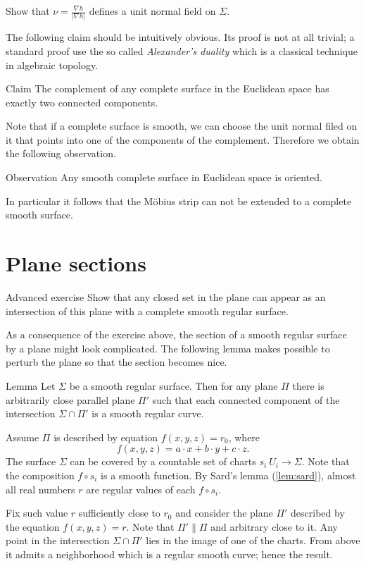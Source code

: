  Show that $\nu=\tfrac{\nabla h}{|\nabla h|}$ defines a unit normal field on $\Sigma$.

The following claim should be intuitively obvious. 
Its proof is not at all trivial; a standard proof use the so called \emph{Alexander's duality} which is a classical technique in algebraic topology.

\begin{thm}{Claim}
The complement of any complete surface in the Euclidean space has exactly two connected components. 
\end{thm}

Note that if a complete surface is smooth, we can choose the unit normal filed on it that points into one of the components of the complement.
Therefore we obtain the following observation. 

\begin{thm}{Observation}
Any smooth complete surface in Euclidean space is oriented.
\end{thm}

In particular it follows that the M\"obius strip can not be extended to a complete smooth surface.

\section*{Plane sections}

\begin{thm}{Advanced exercise}
Show that any closed set in the plane can appear as an intersection of this plane with a complete smooth regular surface.  
\end{thm}

As a consequence of the exercise above, the section of a smooth regular surface by a plane might look complicated.
The following lemma makes possible to perturb the plane so that the section becomes nice. 

\begin{thm}{Lemma}\label{lem:reg-section}
Let $\Sigma$ be a smooth regular surface.
Then for any plane $\Pi$ there is arbitrarily close parallel plane $\Pi'$ such that 
each connected component of the intersection $\Sigma\cap \Pi'$ is a smooth regular curve.
\end{thm}

Assume $\Pi$ is described by equation $f(x,y,z)=r_0$, where
\[f(x,y,z)=a\cdot x+b\cdot y+c\cdot z.\] 
The surface $\Sigma$ can be covered by a countable set of charts $s_i\:U_i\to \Sigma$.
Note that the composition $f\circ s_i$ is a smooth function.
By Sard's lemma (\ref{lem:sard}), almost all real numbers $r$ are regular values of each $f\circ s_i$.

Fix such value $r$ sufficiently close to $r_0$ and consider the plane $\Pi'$ described by the equation $f(x,y,z)=r$.
Note that $\Pi'\parallel \Pi$ and arbitrary close to it.
Any point in the intersection $\Sigma\cap\Pi'$ lies in the image of one of the charts.
From above it admits a neighborhood which is a regular smooth curve;
hence the result.\qeds


